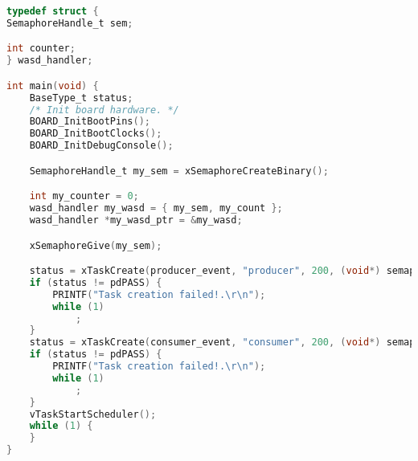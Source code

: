 \begin{lstlisting}[language=c,caption=Problem 4.2 main, label=list:p4_2_main]
typedef struct {
SemaphoreHandle_t sem;

int counter;
} wasd_handler;

int main(void) {
    BaseType_t status;
    /* Init board hardware. */
    BOARD_InitBootPins();
    BOARD_InitBootClocks();
    BOARD_InitDebugConsole();

    SemaphoreHandle_t my_sem = xSemaphoreCreateBinary();

    int my_counter = 0;
    wasd_handler my_wasd = { my_sem, my_count };
    wasd_handler *my_wasd_ptr = &my_wasd;

    xSemaphoreGive(my_sem);

    status = xTaskCreate(producer_event, "producer", 200, (void*) semaphores, 2, NULL);
    if (status != pdPASS) {
        PRINTF("Task creation failed!.\r\n");
        while (1)
            ;
    }
    status = xTaskCreate(consumer_event, "consumer", 200, (void*) semaphores, 2, NULL);
    if (status != pdPASS) {
        PRINTF("Task creation failed!.\r\n");
        while (1)
            ;
    }
    vTaskStartScheduler();
    while (1) {
    }
}
\end{lstlisting}
